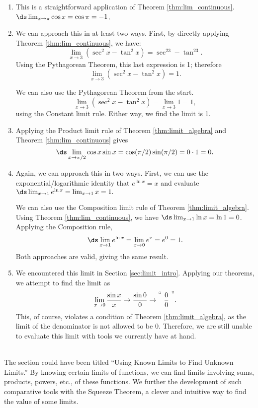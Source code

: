 {
\begin{enumerate}
\item		This is a straightforward application of Theorem \ref{thm:lim_continuous}. $\ds \lim_{x\to \pi} \cos x = \cos \pi = -1$.
\item		We can approach this in at least two ways. First, by directly applying Theorem \ref{thm:lim_continuous}, we have:
				$$\lim_{x\to 3} (\sec^2x - \tan^2 x) = \sec^23-\tan^23.$$ Using the Pythagorean Theorem, this last expression is 1; therefore $$\lim_{x\to 3} (\sec^2x - \tan^2 x) = 1.$$
				
				We can also use the Pythagorean Theorem from the start. $$\lim_{x\to 3} (\sec^2x - \tan^2 x) = \lim_{x\to 3} 1 = 1,$$ using the Constant limit rule. Either way, we find the limit is 1.
				
\item		Applying the Product limit rule of Theorem \ref{thm:limit_algebra} and Theorem \ref{thm:lim_continuous} gives $$\ds \lim_{x\to \pi/2} \cos x\sin x = \cos (\pi/2)\sin(\pi/2) = 0\cdot 1 = 0.$$

\item		Again, we can approach this in two ways. First, we can use the exponential/logarithmic identity that $e^{\ln x} = x$ and evaluate $\ds \lim_{x\to 1} e^{\ln x} = \lim_{x\to 1} x = 1.$ 

We can also use the Composition limit rule of Theorem \ref{thm:limit_algebra}. Using Theorem \ref{thm:lim_continuous}, we have $\ds \lim_{x\to 1}\ln x = \ln 1 = 0$. Applying the Composition rule, $$\ds \lim_{x\to 1} e^{\ln x} = \lim_{x\to 0} e^x = e^0 = 1.$$ Both approaches are valid, giving the same result.

\item		We encountered this limit in Section \ref{sec:limit_intro}. Applying our theorems, we attempt to find the limit as $$\lim_{x\to 0}\frac{\sin x}{x}\rightarrow \frac{\sin 0}{0} \rightarrow \raisebox{8pt}{\text{``\ }}\frac{0}{0}\raisebox{8pt}{\text{\ ''}}.$$ This, of course, violates a condition of Theorem \ref{thm:limit_algebra}, as the limit of the denominator is not allowed to be 0. Therefore, we are still unable to evaluate this limit with tools we currently have at hand.
\end{enumerate}
\baselineskip
}\\

The section could have been titled ``Using Known Limits to Find Unknown Limits.'' By knowing certain limits of functions, we can find limits involving sums, products, powers, etc., of these functions. We further the development of such comparative tools with the Squeeze Theorem, a clever and intuitive way to find the value of some limits. 

